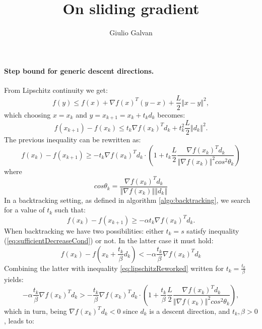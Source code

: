 \documentclass{article}
\title{On sliding gradient}
\author{Giulio Galvan}
\newcommand{\norm}[1]{\left\Vert #1 \right\Vert}
\begin{document}
	\maketitle

\paragraph{Step bound for generic descent directions.}	
From Lipschitz continuity we get:
\begin{equation}
	f(y) \leq f(x) + \nabla f(x)^T(y-x) + \frac{L}{2}\norm{x-y}^2,
\end{equation}
which choosing $x=x_k$ and $y=x_{k+1}=x_k + t_k d_k$ becomes:
\begin{equation}
	f(x_{k+1})-f(x_k) \leq t_k\nabla f(x_k)^Td_k+ t_k^2\frac{L}{2}\norm{d_k}^2.
\end{equation}
The previous inequality can be rewritten as:
\begin{equation}
f(x_k)- f(x_{k+1}) \geq - t_k\nabla f(x_k)^Td_k\cdot \left(1+t_k\frac{L}{2}\frac{\nabla f(x_k)^Td_k}{\norm{\nabla f(x_k)}^2 cos^2\theta_k}\right)
\label{eq:lipschitzReworked}
\end{equation}
where
\begin{equation}
cos\theta_k=\frac{\nabla f(x_k)^Td_k}{\norm{\nabla f(x_k)}\norm{d_k}}
\end{equation}
In a backtracking setting, as defined in algorithm \ref{algo:backtracking}, we search for a value of $t_k$ such that:
\begin{equation}
	f(x_k) - f(x_{k+1})\geq -\alpha t_k \nabla f(x_k)^Td_k.
	\label{eq:sufficientDecreaseCond}
\end{equation}
When backtracking we have two possibilities: either $t_k=s$ satisfy inequality (\ref{eq:sufficientDecreaseCond}) or not. In the latter case it must hold:
\begin{equation}
		f(x_k)-f(x_{k}+\frac{t_k}{\beta}d_k) < -\alpha \frac{t_k}{\beta} \nabla f(x_k)^Td_k
\label{eq:sufficientDecreaseViolated}
\end{equation}
Combining the latter with inequality \ref{eq:lipschitzReworked} written for $t_k=\frac{t_k}{\beta}$ yields:
\begin{equation}
-\alpha \frac{t_k}{\beta} \nabla f(x_k)^Td_k > - \frac{t_k}{\beta}\nabla f(x_k)^Td_k\cdot \left(1+\frac{t_k}{\beta}\frac{L}{2}\frac{\nabla f(x_k)^Td_k}{\norm{\nabla f(x_k)}^2 cos^2\theta_k}\right),
\end{equation}
which in turn, being $\nabla f(x_k)^Td_k<0$ since $d_k$ is a descent direction, and $t_k,\beta>0$, leads to:
\end{document}
